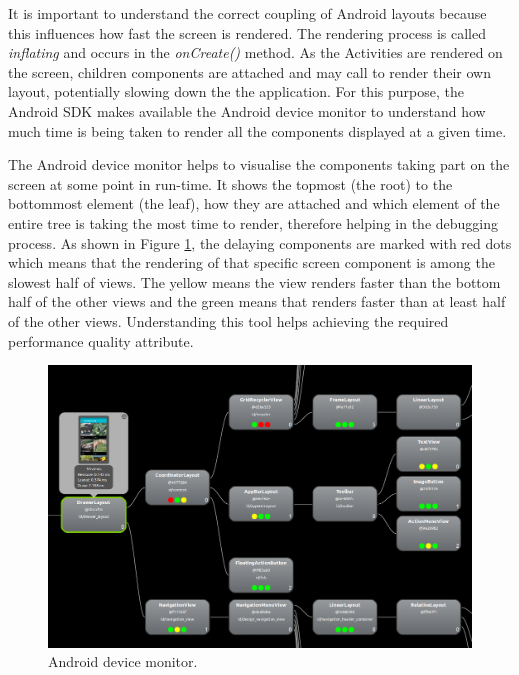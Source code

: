 It is important to understand the correct coupling of Android layouts because this influences how fast the screen is rendered. The rendering process is called \textit{inflating} and occurs in the \textit{onCreate()} method. As the Activities are rendered on the screen, children components are attached and may call to render their own layout, potentially slowing down the the application. For this purpose, the Android SDK makes available the Android device monitor to understand how much time is being taken to render all the components displayed at a given time. 

The Android device monitor helps to visualise the components taking part on the screen at some point in run-time. It shows  the topmost (the root) to the bottommost element (the leaf), how they are attached and which element of the entire tree is taking the most time to render, therefore helping in the debugging process. As shown in Figure \ref{fig:android_device_monitor}, the delaying components are marked with red dots which means that the rendering of that specific screen component is among the slowest half of views. The yellow means the view renders faster than the bottom half of the other views and the green means that renders faster than at least half of the other views. Understanding this tool helps achieving the required performance quality attribute. 

\begin{figure}[H]
\begin{adjustbox}{width=1\textwidth,center=\textwidth}
  \centering
  \includegraphics[scale=1]{images/android_device_monitor_2.png}
\end{adjustbox}
  \caption[Android device monitor]{Android device monitor.}
  \label{fig:android_device_monitor}
\end{figure}

